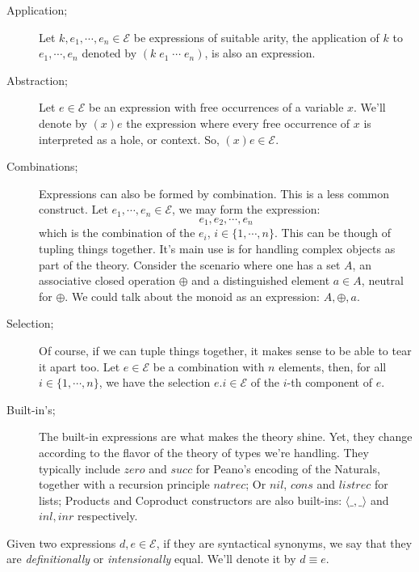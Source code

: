 \begin{mydef}[Expressions]\hfill
\begin{description}
  \item[Application;]
    Let $k, e_1, \cdots, e_n \in \mathcal{E}$ be expressions of suitable arity, 
    the application of $k$ to $e_1, \cdots, e_n$ denoted by $(k\;e_1\;\cdots\;e_n)$,
    is also an expression.
  
  \item[Abstraction;]
    Let $e \in \mathcal{E}$ be an expression with free occurrences of a variable $x$.
    We'll denote by $(x)e$ the expression where every free occurrence of $x$ is
    interpreted as a hole, or context. So, $(x)e \in \mathcal{E}$.
  
  \item[Combinations;]
    Expressions can also be formed by combination. This is a less common construct.
    Let $e_1, \cdots, e_n \in \mathcal{E}$, we may form the expression:
    \[
      e_1,e_2,\cdots,e_n
    \]
    which is the combination of the $e_i$, $i \in \{1,\cdots,n\}$. 
    This can be though of tupling things together. It's main use is for
    handling complex objects as part of the theory. Consider the
    scenario where one has a set $A$, an associative closed operation $\oplus$ and
    a distinguished element $a \in A$, neutral for $\oplus$. We could talk
    about the monoid as an expression: $A, \oplus, a$.
  
  \item[Selection;]
    Of course, if we can tuple things together, it makes sense to be able to
    tear it apart too. Let $e\in\mathcal{E}$ be a combination with
    $n$ elements, then, for all $i \in \{1, \cdots, n\}$, we have the
    selection $e.i \in \mathcal{E}$ of the $i$-th component of $e$.
  
  \item[Built-in's;]
    The built-in expressions are what makes the theory shine. Yet, 
    they change according to the flavor of the theory of types we're handling.
    They typically include $zero$ and $succ$ for Peano's encoding of the Naturals, 
    together with a recursion principle $natrec$; Or $nil$, $cons$ and $listrec$
    for lists; Products and Coproduct constructors are also built-ins: $\langle\_,\_\rangle$
    and $inl, inr$ respectively.
\end{description}
\end{mydef}\hfill

\begin{mydef}
Given two expressions $d, e \in \mathcal{E}$, if they are syntactical synonyms, we say
that they are \emph{definitionally} or \emph{intensionally} equal. We'll denote it
by $d \equiv e$.
\end{mydef}

